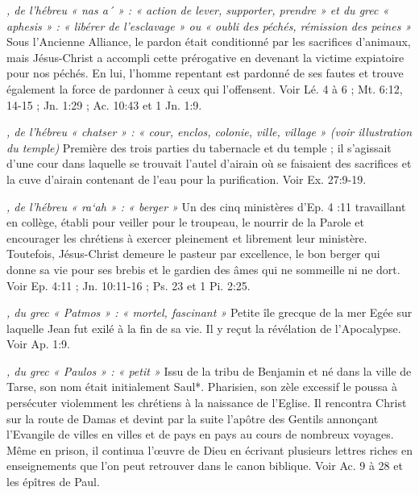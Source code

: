 \begin{multicols}{2}
\textit{, de l'hébreu « nas a´ » : « action de lever, supporter, prendre » et du grec « aphesis » : « libérer de l'esclavage » ou « oubli des péchés, rémission des peines »}\newline
Sous l'Ancienne Alliance, le pardon était conditionné par les sacrifices d'animaux, mais Jésus-Christ a accompli cette prérogative en devenant la victime expiatoire pour nos péchés. En lui, l'homme repentant est pardonné de ses fautes et trouve également la force de pardonner à ceux qui l'offensent. Voir Lé. 4 à 6 ; Mt. 6:12, 14-15 ; Jn. 1:29 ; Ac. 10:43 et 1 Jn. 1:9.

\textit{, de l'hébreu « chatser » : « cour, enclos, colonie, ville, village » (voir illustration du temple)}\newline
Première des trois parties du tabernacle et du temple ; il s'agissait d'une cour dans laquelle se trouvait l'autel d'airain où se faisaient des sacrifices et la cuve d'airain contenant de l'eau pour la purification. Voir Ex. 27:9-19.

\textit{, de l'hébreu « ra`ah » : « berger »}\newline
Un des cinq ministères d'Ep. 4 :11 travaillant en collège, établi pour veiller pour le troupeau, le nourrir de la Parole et encourager les chrétiens à exercer pleinement et librement leur ministère. Toutefois, Jésus-Christ demeure le pasteur par excellence, le bon berger qui donne sa vie pour ses brebis et le gardien des âmes qui ne sommeille ni ne dort. Voir Ep. 4:11 ; Jn. 10:11-16 ; Ps. 23 et 1 Pi. 2:25.

\textit{, du grec « Patmos » : « mortel, fascinant »}\newline
Petite île grecque de la mer Egée sur laquelle Jean fut exilé à la fin de sa vie. Il y reçut la révélation de l'Apocalypse. Voir Ap. 1:9.

\textit{, du grec « Paulos » : « petit »}\newline
Issu de la tribu de Benjamin et né dans la ville de Tarse, son nom était initialement Saul*. Pharisien, son zèle excessif le poussa à persécuter violemment les chrétiens à la naissance de l'Eglise. Il rencontra Christ sur la route de Damas et devint par la suite l'apôtre des Gentils annonçant l'Evangile de villes en villes et de pays en pays au cours de nombreux voyages. Même en prison, il continua l'œuvre de Dieu en écrivant plusieurs lettres riches en enseignements que l'on peut retrouver dans le canon biblique. Voir Ac. 9 à 28 et les épîtres de Paul.


\end{multicols}
